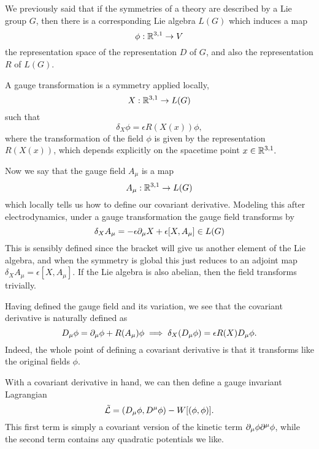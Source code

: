 We previously said that if the symmetries of a theory are described by a Lie group $G$, then there is a corresponding Lie algebra $L(G)$ which induces a map
$$\phi:\mathbb{R}^{3,1}\to V$$ the representation space of the representation $D$ of $G$, and also the representation $R$ of $L(G)$.

A gauge transformation is a symmetry applied locally,
$$X:\mathbb{R}^{3,1}\to L(G)$$
such that
$$\delta_X\phi = \epsilon R(X(x))\phi,$$
where the transformation of the field $\phi$ is given by the representation $R(X(x))$, which depends explicitly on the spacetime point $x\in \mathbb{R}^{3,1}.$

Now we say that the gauge field $A_\mu$ is a map
$$A_\mu:\mathbb{R}^{3,1}\to L(G)$$
which locally tells us how to define our covariant derivative. Modeling this after electrodynamics, under a gauge transformation the gauge field transforms by
$$\delta_X A_\mu = -\epsilon \partial_\mu X + \epsilon [X,A_\mu]\in L(G)$$
This is sensibly defined since the bracket will give us another element of the Lie algebra, and when the symmetry is global this just reduces to an adjoint map $\delta_X A_\mu = \epsilon [X,A_\mu]$. If the Lie algebra is also abelian, then the field transforms trivially.

Having defined the gauge field and its variation, we see that the covariant derivative is naturally defined as
$$D_\mu \phi = \partial_\mu \phi+R(A_\mu)\phi \implies \delta_X(D_\mu\phi)=\epsilon R(X) D_\mu \phi.$$
Indeed, the whole point of defining a covariant derivative is that it transforms like the original fields $\phi$.

With a covariant derivative in hand, we can then define a gauge invariant Lagrangian
$$\tilde {\mathcal L} = (D_\mu \phi, D^\mu \phi)-W[(\phi,\phi)].$$
This first term is simply a covariant version of the kinetic term $\partial_\mu \phi \partial^\mu \phi$, while the second term contains any quadratic potentials we like.

